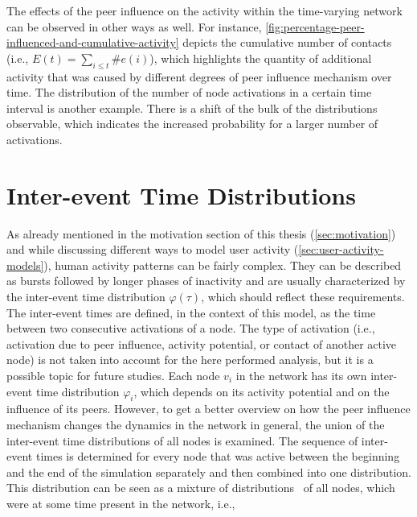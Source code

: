 The effects of the peer influence on the activity within the time-varying network can be observed in other ways as well.
For instance, \cref{fig:percentage-peer-influenced-and-cumulative-activity} depicts the cumulative number of contacts (i.e., \( E(t) = \sum_{i \leq t} \#e(i) \)), which highlights the quantity of additional activity that was caused by different degrees of peer influence mechanism over time.
The distribution of the number of node activations in a certain time interval is another example.
There is a shift of the bulk of the distributions observable, which indicates the increased probability for a larger number of activations.




\section{Inter-event Time Distributions}
\label{sec:inter-event-time-dists}

As already mentioned in the motivation section of this thesis (\cref{sec:motivation}) and while discussing different ways to model user activity (\cref{sec:user-activity-models}), human activity patterns can be fairly complex.
They can be described as bursts followed by longer phases of inactivity and are usually characterized by the inter-event time distribution \( \varphi(\tau) \), which should reflect these requirements.
The inter-event times are defined, in the context of this model, as the time between two consecutive activations of a node.
The type of activation (i.e., activation due to peer influence, activity potential, or contact of another active node) is not taken into account for the here performed analysis, but it is a possible topic for future studies.
Each node \( v_{i} \) in the network has its own inter-event time distribution \( \varphi_{i} \), which depends on its activity potential and on the influence of its peers.
However, to get a better overview on how the peer influence mechanism changes the dynamics in the network in general, the union of the inter-event time distributions of all nodes is examined.
The sequence of inter-event times is determined for every node that was active between the beginning and the end of the simulation separately and then combined into one distribution.
This distribution can be seen as a mixture of distributions~\cite{Seidel2011} of all nodes, which were at some time present in the network, i.e.,

